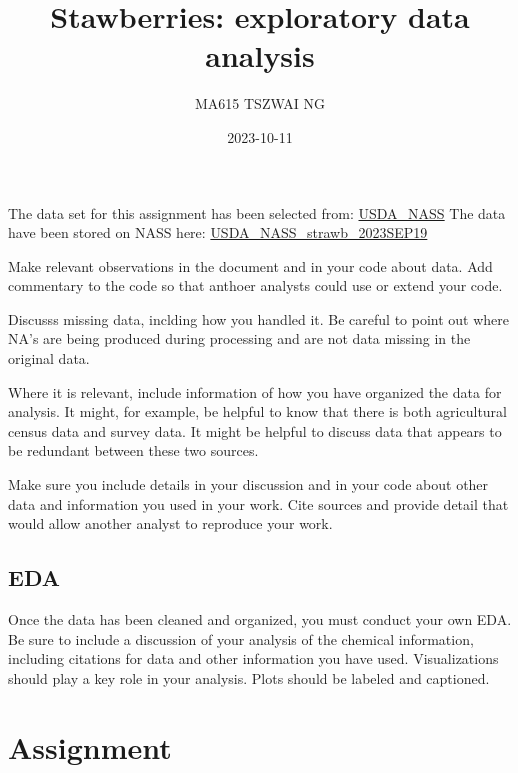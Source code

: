 \documentclass[
  letterpaper,
  DIV=11,
  numbers=noendperiod]{scrartcl}
\title{Stawberries: exploratory data analysis}
\author{MA615 TSZWAI NG}
\date{2023-10-11}
\begin{document}
\maketitle
\ifdefined\Shaded\renewenvironment{Shaded}{\begin{tcolorbox}[breakable, boxrule=0pt, frame hidden, borderline west={3pt}{0pt}{shadecolor}, interior hidden, sharp corners, enhanced]}{\end{tcolorbox}}\fi

The data set for this assignment has been selected from:
\href{https://quickstats.nass.usda.gov}{USDA\_NASS} The data have been
stored on NASS here:
\href{https://quickstats.nass.usda.gov/results/45FBC825-B104-38E2-9802-839F5F3C7036}{USDA\_NASS\_strawb\_2023SEP19}

Make relevant observations in the document and in your code about data.
Add commentary to the code so that anthoer analysts could use or extend
your code.

Discusss missing data, inclding how you handled it. Be careful to point
out where NA's are being produced during processing and are not data
missing in the original data.

Where it is relevant, include information of how you have organized the
data for analysis. It might, for example, be helpful to know that there
is both agricultural census data and survey data. It might be helpful to
discuss data that appears to be redundant between these two sources.

Make sure you include details in your discussion and in your code about
other data and information you used in your work. Cite sources and
provide detail that would allow another analyst to reproduce your work.

\hypertarget{eda}{%
\subsection{EDA}\label{eda}}

Once the data has been cleaned and organized, you must conduct your own
EDA. Be sure to include a discussion of your analysis of the chemical
information, including citations for data and other information you have
used. Visualizations should play a key role in your analysis. Plots
should be labeled and captioned.

\hypertarget{assignment}{%
\section{Assignment}\label{assignment}}
\end{document}
